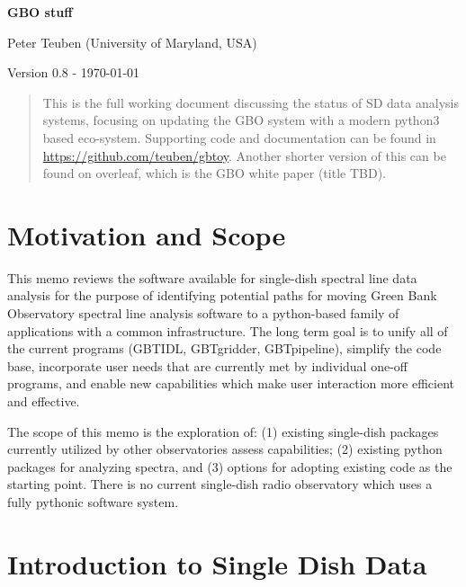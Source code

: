 \documentclass[12pt,a4paper]{article}
\begin{document}
\pagestyle{plain}
 

\begin{center}
{\Large{\bf{  GBO stuff  \\  }}} 

\end{center}
\bigskip

\centerline{Peter Teuben (University of Maryland, USA)}

\centerline{Version 0.8 - \today}
\bigskip

\begin{abstract}

This is the full working document discussing the status of SD data analysis
systems, focusing on updating the GBO system with a modern python3
based eco-system. Supporting code and documentation can be found in
\url{https://github.com/teuben/gbtoy}.  Another shorter version of this
can be found on overleaf, which is the GBO white paper (title TBD).

\end{abstract}

\section{Motivation and Scope}

This memo reviews the software available for single-dish spectral line data analysis for the purpose of identifying potential paths for moving Green Bank Observatory spectral line analysis software to a python-based family of applications with a common infrastructure. The long term goal is to unify all of the current programs (GBTIDL, GBTgridder, GBTpipeline), simplify the code base, incorporate user needs that are currently met by individual one-off programs, and enable new capabilities which make user interaction more efficient and effective.

The scope of this memo is the exploration of: (1) existing single-dish packages currently utilized by other observatories assess capabilities; (2) existing python packages for analyzing spectra, and (3) options for adopting existing code as the starting point. There is no current single-dish radio observatory which uses a fully pythonic software system.

\section{Introduction to Single Dish Data}
\end{document}
